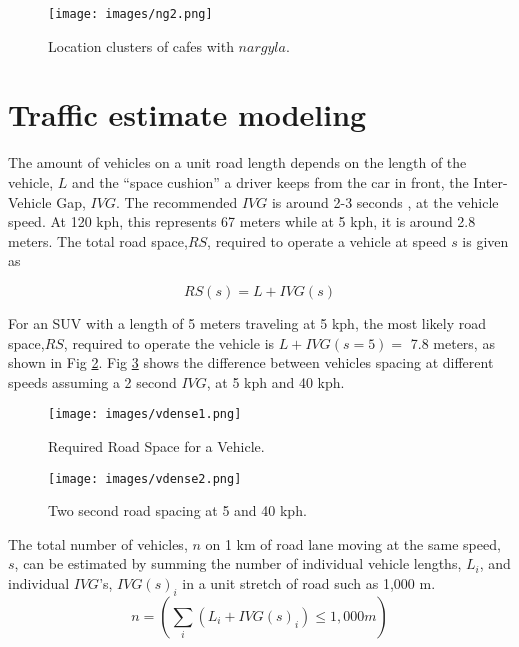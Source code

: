 %
\begin{figure}
\texttt{[image: images/ng2.png]} 
\caption{Location clusters of cafes with $nargyla$.}
\label{figng2:cafes}
\end{figure}

\section{Traffic estimate modeling}
The amount of vehicles on a unit road length depends on the length of the vehicle, $L$ and the ``space cushion” a driver keeps from the car in front, the Inter-Vehicle Gap, $IVG$.  The recommended $IVG$ is around 2-3 seconds ,  at the vehicle speed.  At 120 kph, this represents 67 meters while at 5 kph, it is around 2.8 meters.  The total road space,$RS$, required to operate a vehicle at speed $s$ is given as

\begin{equation}
\label{eq1:roadspace}
RS(s)=L +IVG(s)
\end{equation}

For an SUV with a length of 5 meters traveling at 5 kph, the most likely road space,$RS$, required to operate the vehicle is $L + IVG(s=5) =$ 7.8 meters, as shown in Fig \ref{fig1:roadspace}.  Fig \ref{fig2:2secroadspace} shows the difference between vehicles spacing at different speeds assuming a 2 second $IVG$, at 5 kph and 40 kph.
%
\begin{figure}
\texttt{[image: images/vdense1.png]} 
\caption{Required Road Space for a Vehicle.}
\label{fig1:roadspace}
\end{figure}
%

%
\begin{figure}
\texttt{[image: images/vdense2.png]} 
\caption{Two second road spacing at 5 and 40 kph.}
\label{fig2:2secroadspace}
\end{figure}
%

The total number of vehicles, $n$ on 1 km of road lane moving at the same speed, $s$, can be estimated by summing the number of individual vehicle lengths, $L_{i}$, and individual $IVG$'s, $IVG(s)_{i}$ in a unit stretch of road such as 1,000 m. 
\begin{equation}
\label{eq1:roadspace}
n =  \left ( \sum_{i}\left ({L_{i} + IVG(s)_{i}} \right )\leq 1,000m   \right ) 
\end{equation}

